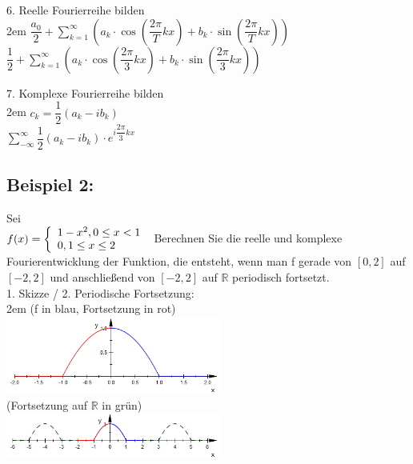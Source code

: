 \documentclass[11pt,final]{scrreprt}
\newcommand{\br} {\medskip\\}
\newcommand{\R} {\mathbb R}
\begin{document}
6. Reelle Fourierreihe bilden\\

\begingroup
\leftskip2em 
$ \dfrac{a_0}{2} + \sum\limits_{k=1}^{\infty} (a_k \cdot \cos(\dfrac{2\pi}{T} kx) + b_k \cdot \sin(\dfrac{2\pi}{T} kx)) $\\
$ \dfrac{1}{2} + \sum\limits_{k=1}^{\infty} (a_k \cdot \cos(\dfrac{2\pi}{3} kx) + b_k \cdot \sin(\dfrac{2\pi}{3} kx)) $\br
\par	
\endgroup 

7. Komplexe Fourierreihe bilden\\

\begingroup
\leftskip2em 
$ c_k = \dfrac{1}{2} (a_k - ib_k)$\\
$ \sum\limits_{-\infty}^{\infty} \dfrac{1}{2} (a_k - ib_k) \cdot e^{i\dfrac{2\pi}{3} kx} $\br
\par	
\endgroup 

\newpage
\subsection*{Beispiel 2:}
\bigskip
Sei\\
$
f(x) = \left\{
\begin{array}{l}
1-x^2, 0 \leq x < 1 \\
0, 1 \leq x\leq 2 \\
\end{array}
\right.\\\\
$
Berechnen Sie die reelle und komplexe Fourierentwicklung der Funktion, die entsteht, wenn man f gerade von $[0, 2]$ auf $[-2, 2]$ und anschließend von $[-2, 2]$ auf $\R$ periodisch fortsetzt.\br


1. Skizze / 2. Periodische Fortsetzung:\\

\begingroup
\leftskip2em 
(f in blau, Fortsetzung in rot)\\
\includegraphics[width=200pt]{images/fourierExample2_1}\\
(Fortsetzung auf $\R$ in grün)\\
\includegraphics[width=200pt]{images/fourierExample2_2}\br\\
\par	
\endgroup 
\end{document}
